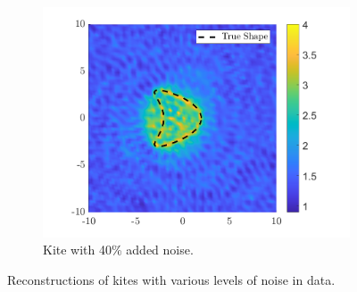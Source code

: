 \documentclass[]{article}
\begin{document}
\begin{figure}[h]
\begin{subfigure}{.3\textwidth}
						\centering
						\includegraphics[width = \textwidth]{Numeric Simulations/Images/kite-40-noise-reconstructed}
						\caption{Kite with 40\% added noise.}
					\end{subfigure}
					\caption{Reconstructions of kites with various levels of noise in data.}
					\label{fig:kitenoise}
				\end{figure} 
		\printbibliography
			
\end{document}
